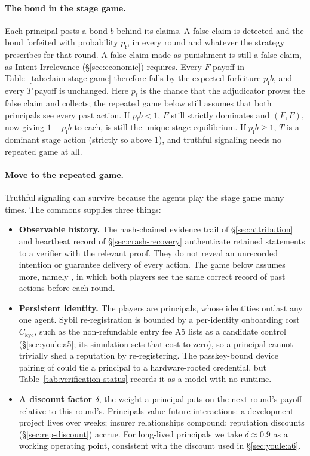 \documentclass[11pt,a4paper]{article}
\theoremstyle{definition}
\theoremstyle{remark}
\begin{document}
\paragraph{The bond in the stage game.}
Each principal posts a bond $b$ behind its claims. A false claim is detected
and the bond forfeited with probability $p_{\mathrm f}$, in every round and
whatever the strategy prescribes for that round. A false claim made as
punishment is still a false claim, as Intent Irrelevance
(\S\ref{sec:economic}) requires. Every $F$ payoff in
Table~\ref{tab:claim-stage-game} therefore falls by the expected forfeiture
$p_{\mathrm f}b$, and every $T$ payoff is unchanged. Here $p_{\mathrm f}$ is
the chance that the adjudicator proves the false claim and collects; the
repeated game below still assumes that both principals see every past action.
If $p_{\mathrm f}b<1$, $F$ still strictly dominates and $(F,F)$, now giving
$1-p_{\mathrm f}b$ to each, is still the unique stage equilibrium. If
$p_{\mathrm f}b\ge1$, $T$ is a dominant stage action (strictly so above $1$),
and truthful signaling needs no repeated game at all.

\paragraph{Move to the repeated game.}
Truthful signaling can survive because the agents play the stage game many times. The commons supplies three things:
\begin{itemize}[nosep]
  \item \textbf{Observable history.} The hash-chained evidence trail of \S\ref{sec:attribution} and heartbeat record of \S\ref{sec:crash-recovery} authenticate retained statements to a verifier with the relevant proof.
They do not reveal an unrecorded intention or guarantee delivery of every action.
The game below assumes more, namely , in which
both players see the same correct record of past actions before each round.
  \item \textbf{Persistent identity.} The players are principals, whose identities outlast any one agent. Sybil re-registration is bounded by a per-identity onboarding cost $C_{\mathrm{kyc}}$, such as the non-refundable entry fee A5 lists as a candidate control (\S\ref{sec:youle:a5}; its simulation sets that cost to zero), so a principal cannot trivially shed a reputation by re-registering. The passkey-bound device pairing of  could tie a principal to a hardware-rooted credential, but Table~\ref{tab:verification-status} records it as a model with no runtime.
  \item \textbf{A discount factor $\delta$}, the weight a principal puts on the next round's payoff relative to this round's. Principals value future interactions: a development project lives over weeks; insurer relationships compound; reputation discounts (\S\ref{sec:rep-discount}) accrue. For long-lived principals we take $\delta \approx 0.9$ as a working operating point, consistent with the discount used in \S\ref{sec:youle:a6}.
\end{itemize}
\end{document}
